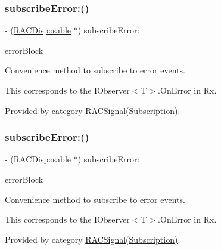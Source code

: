 \subsubsection{\texorpdfstring{subscribe\+Error\+:()}{subscribeError:()}\hspace{0.1cm}{\footnotesize\ttfamily [1/3]}}
{\footnotesize\ttfamily -\/ (\mbox{\hyperlink{interface_r_a_c_disposable}{R\+A\+C\+Disposable}} $\ast$) subscribe\+Error\+: \begin{DoxyParamCaption}\item[{(void($^\wedge$)(N\+S\+Error $\ast$error))}]{error\+Block }\end{DoxyParamCaption}}

Convenience method to subscribe to {\ttfamily error} events.

This corresponds to the {\ttfamily I\+Observer$<$T$>$.On\+Error} in Rx. 

Provided by category \mbox{\hyperlink{category_r_a_c_signal_07_subscription_08_a6e792da9c8499ad5791e14bd126e99cb}{R\+A\+C\+Signal(\+Subscription)}}.

\mbox{\label{interface_r_a_c_signal_a6e792da9c8499ad5791e14bd126e99cb}} 
\subsubsection{\texorpdfstring{subscribe\+Error\+:()}{subscribeError:()}\hspace{0.1cm}{\footnotesize\ttfamily [2/3]}}
{\footnotesize\ttfamily -\/ (\mbox{\hyperlink{interface_r_a_c_disposable}{R\+A\+C\+Disposable}} $\ast$) subscribe\+Error\+: \begin{DoxyParamCaption}\item[{(void($^\wedge$)(N\+S\+Error $\ast$error))}]{error\+Block }\end{DoxyParamCaption}}

Convenience method to subscribe to {\ttfamily error} events.

This corresponds to the {\ttfamily I\+Observer$<$T$>$.On\+Error} in Rx. 

Provided by category \mbox{\hyperlink{category_r_a_c_signal_07_subscription_08_a6e792da9c8499ad5791e14bd126e99cb}{R\+A\+C\+Signal(\+Subscription)}}.

